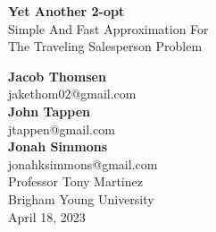 \documentclass[12pt]{report}
\begin{document}
\begin{titlepage}
    \begin{center}
        \vspace*{1cm}
        \Huge
        \textbf{Yet Another 2-opt} \\

        \vspace{0.5cm}
        \large
        Simple And Fast Approximation For \\
        The Traveling Salesperson Problem
            
        \vspace{1.5cm}

        \textbf{Jacob Thomsen} \\
        jakethom02@gmail.com \\
        \vspace{0.5cm}
        \textbf{John Tappen} \\
        jtappen@gmail.com \\
        \vspace{0.5cm}
        \textbf{Jonah Simmons} \\
        jonahksimmons@gmail.com \\

        \vfill
        Professor Tony Martinez \\
        Brigham Young University \\
        April 18, 2023
        \normalsize
    \end{center}
\end{titlepage}
\end{document}
